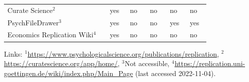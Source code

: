 \documentclass[12pt, a4paper, twocolumn]{article}
\begin{document}
\begin{table}[ht]
\begin{tabular}{p{0.41\linewidth} p{0.08\linewidth} p{0.08\linewidth} p{0.08\linewidth}  p{0.08\linewidth} p{0.08\linewidth}}
		Curate Science$^{2}$                                                                                       & yes                        & no                            & no                                                      & no              & no         \\
		PsychFileDrawer$^{3}$                                                                                   & yes                        & no                            & no                                                        & yes               & yes      \\
		Economics Replication Wiki$^{4}$                                                          & yes                        & no                            & no                                                                  & no                & no       \\ \hline
		\end{tabular}
		    \begin{tablenotes}
		      \small
		      \item \raggedright\arraybackslash\tiny Links: $^{1}$\url{https://www.psychologicalscience.org/publications/replication}, $^{2}$\url{https://curatescience.org/app/home/}, $^{3}$Not accessible, $^{4}$\url{https://replication.uni-goettingen.de/wiki/index.php/Main_Page} (last accessed 2022-11-04).
		    \end{tablenotes}
		
		\end{table}
\end{document}
